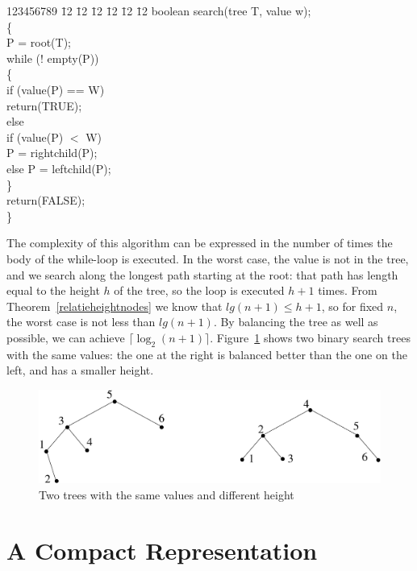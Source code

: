 \parbox{9cm}{
\begin{tabbing}
123456789 \= 12 \= 12 \= 12 \= 12 \= 12 \= 12 \kill
\> boolean search(tree T, value w);\\
\> \{\\
\> \> P = root(T);\\
\> \> while (! empty(P))\\
\> \> \{\\
\> \> \> if (value(P) == W)\\
\> \> \> \> \> return(TRUE);\\
\> \> \> else\\
\> \> \> if (value(P) $<$ W)\\
\> \> \> \> P = rightchild(P);\\
\> \> \> else P = leftchild(P);\\
\> \> \}\\
\> \> return(FALSE);\\
\> \}
\end{tabbing}
}

The complexity of this algorithm can be expressed in the number of
times the body of the while-loop is executed. In the worst case,
the value is not in the tree, and we search along the longest path
starting at the root: that path has length equal to the height $h$ of
the tree, so the loop is executed $h+1$ times. From
Theorem~\ref{relatieheightnodes} we know that $lg(n+1) \leq h+1$, so
for fixed $n$, the worst case is not less than $lg(n+1)$. By balancing
the tree as well as possible, we can achieve $\lceil \log_2(n+1)
\rceil$. Figure~\ref{balanced1} shows two binary search trees with the
same values: the one at the right is balanced better than the one on
the left, and has a smaller height.

\begin{figure}[ht]
\begin{center}
\includegraphics[width=0.6\linewidth,keepaspectratio]{balanced1}
\end{center}
\caption{Two trees with the same values and different height \label{balanced1}}
\end{figure}


\section{A Compact Representation}

